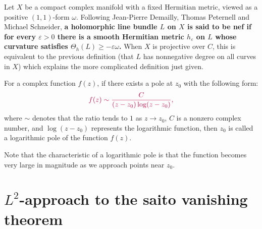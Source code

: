 \documentclass[lang=en,12pt]{beautybook}
\begin{document}
\begin{definition}
  Let $X$ be a compact complex manifold with a fixed Hermitian metric, viewed as a positive $(1,1)$-form $\omega$. Following Jean-Pierre Demailly, Thomas Peternell and Michael Schneider, \textbf{\color{purple} a holomorphic line bundle $L$ on $X$ is said to be nef if for every $\varepsilon>0$ there is a smooth Hermitian metric $h_\varepsilon$ on $L$ whose curvature satisfies $\Theta_h(L) \geqslant-\varepsilon \omega$.} When $X$ is projective over $C$, this is equivalent to the previous definition (that $L$ has nonnegative degree on all curves in $X$) which explains the more complicated definition just given.
\end{definition}
\begin{definition}
  For a complex function $f(z)$, if there exists a pole at $z_0$ with the following form:
  \[\color{purple} f(z)\sim \frac{C}{(z-z_0)\log (z-z_0)},\]
  where $\sim$ denotes that the ratio tends to $1$ as $z\to z_0$, $C$ is a nonzero complex number, and $\log(z-z_0)$ represents the logarithmic function, then $z_0$ is called a logarithmic pole of the function $f(z)$.

  Note that the characteristic of a logarithmic pole is that the function becomes very large in magnitude as we approach points near $z_0$.
\end{definition}

\chapter{\texorpdfstring{$L^2$}{}-approach to the saito vanishing theorem}
\end{document}
